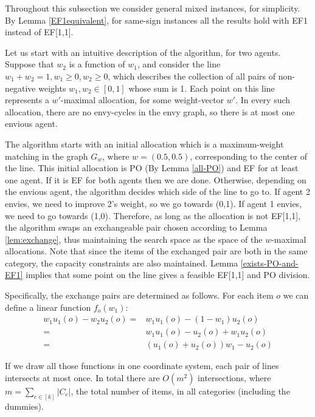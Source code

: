 \documentclass[sigconf]{aamas}
\theoremstyle{definition}
\begin{document}
Throughout this subsection we consider general mixed instances, for simplicity. 
By Lemma \ref{EF1equivalent}, for same-sign instances all the results hold with EF1 instead of EF[1,1]. 

Let us start with an intuitive description of the algorithm, for two agents.
Suppose that $w_2$ is a function of $w_1$, and consider the line $w_1+w_2=1, w_1\geq 0, w_2\geq 0$, which describes the collection of all pairs of non-negative weights $w_1, w_2\in [0,1]$ whose sum is 1.
Each point on this line represents a $w'$-maximal allocation, for some weight-vector $w'$.
In every such allocation, there are no envy-cycles in the envy graph, so there is at most one envious agent. 

The algorithm starts with an initial allocation which is a maximum-weight matching in the graph $G_w$, where $w=(0.5,0.5)$, corresponding to the center of the line.
This initial allocation is PO (By Lemma \ref{all-PO}) and EF for at least one agent. If it is EF for both agents then we are done. Otherwise, 
depending on the envious agent, the algorithm decides which side of the line to go to. If agent 2 envies, we need to improve 2's weight, so we go towards (0,1). If agent 1 envies, we need to go towards (1,0).
Therefore, as long as the allocation is not EF[1,1], the algorithm swaps an exchangeable pair chosen according to Lemma \ref{lem:exchange}, thus maintaining the search space as the space of the $w$-maximal allocations.
Note that since the items of the exchanged pair are both in the same category, the capacity constraints are also maintained. 
Lemma \ref{exists-PO-and-EF1} implies that
some point on the line gives a feasible EF[1,1] and PO division.

Specifically, the exchange pairs are determined as follows.
For each item $o$ we can define a linear function $f_o(w_1)$:
\begin{align*}
    w_1 u_1(o) - w_2 u_2(o) 
    =&
    w_1 u_1(o) - (1-w_1) u_2(o) \\
    =&
    w_1 u_1(o) - u_2(o) + w_1 u_2(o) \\
    =& 
    (u_1(o) + u_2(o)) w_1 - u_2(o)
\end{align*}

If we draw all those functions in one coordinate system, each pair of lines intersects at most once. 
In total there are $O(m^2)$ intersections, where $m= \sum_{c\in [k]}|C_c|$, the total number of items, in all categories (including the dummies).
\end{document}

